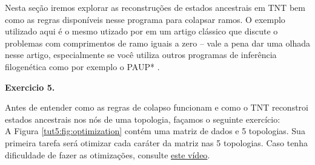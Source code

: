 \begin{refsection}
Nesta seção iremos explorar as reconstruções de estados ancestrais em TNT bem como as regras disponíveis nesse programa para colapsar ramos. O exemplo utilizado aqui é o mesmo utizado por \textcite{Coddington_and_Scharff_1994} em um artigo clássico que discute o problemas com comprimentos de ramo iguais a zero -- vale a pena dar uma olhada nesse artigo, especialmente se você utiliza outros programas de inferência filogenética como por exemplo o PAUP* \parencite{Swofford_2003}.\\

\begin{blackBlock}{\textbf{Exercicio 5.}}\label{tut4:ex:5.2}

Antes de entender como as regras de colapso funcionam e como o TNT reconstroi estados ancestrais nos nós de uma topologia, façamos o seguinte exercício:\\
A Figura \ref{tut5:fig:optimization} contém uma matriz de dados e 5 topologias. Sua primeira tarefa será otimizar cada caráter da matriz nas 5 topologias. Caso tenha dificuldade de fazer as otimizações, consulte \href{http://www.youtube.com/watch?feature=player_embedded&v=Z2GawDYYfCE}{este vídeo}.\\

\end{blackBlock}


\end{refsection}

